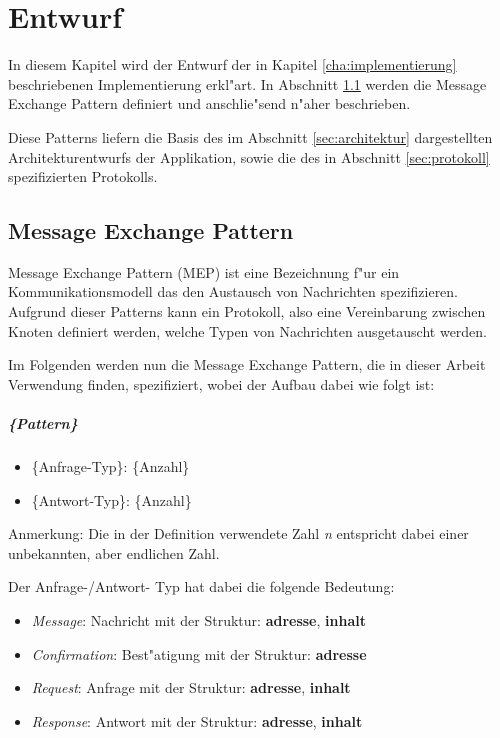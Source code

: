 \chapter{Entwurf}
\label{cha:entwurf}

In diesem Kapitel wird der Entwurf der in Kapitel \ref{cha:implementierung} beschriebenen Implementierung erkl"art. In Abschnitt \ref{sec:mep} werden die Message Exchange Pattern definiert und anschlie"send n"aher beschrieben. 

Diese Patterns liefern die Basis des im Abschnitt \ref{sec:architektur} dargestellten Architekturentwurfs der Applikation, sowie die des in Abschnitt \ref{sec:protokoll} spezifizierten Protokolls.

\section{Message Exchange Pattern}
\label{sec:mep}


Message Exchange Pattern (MEP) ist eine Bezeichnung f"ur ein Kommunikationsmodell das den Austausch von Nachrichten spezifizieren. Aufgrund dieser Patterns kann ein Protokoll, also eine Vereinbarung zwischen Knoten definiert werden, welche Typen von Nachrichten ausgetauscht werden.

Im Folgenden werden nun die Message Exchange Pattern, die in dieser Arbeit Verwendung finden, spezifiziert, wobei der Aufbau dabei wie folgt ist:
\paragraph{\{Pattern\}}
\begin{itemize}
\item \{Anfrage-Typ\}: \{Anzahl\} 
\item \{Antwort-Typ\}: \{Anzahl\}
\end{itemize}
Anmerkung: Die in der Definition verwendete Zahl {\it n} entspricht dabei einer unbekannten, aber endlichen Zahl.

Der Anfrage-/Antwort- Typ hat dabei die folgende Bedeutung:
\begin{itemize}
\item {\it Message}: Nachricht mit der Struktur: {\bf adresse}, {\bf inhalt}
\item {\it Confirmation}: Best"atigung mit der Struktur: {\bf adresse}
\item {\it Request}: Anfrage mit der Struktur: {\bf adresse}, {\bf inhalt}
\item{\it Response}: Antwort mit der Struktur: {\bf adresse}, {\bf inhalt}
\end{itemize}

